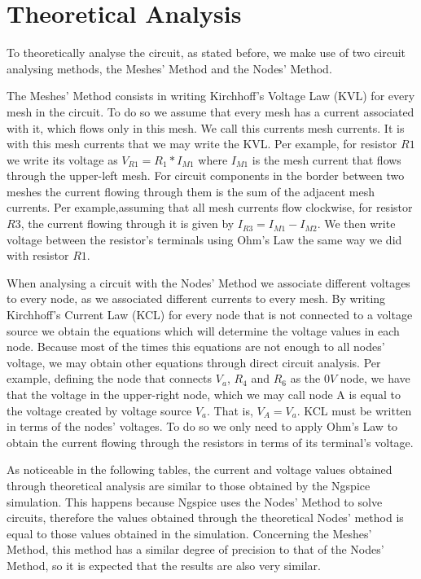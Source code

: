 \section{Theoretical Analysis}
\label{sec:analysis}

To theoretically analyse the circuit, as stated before, we make use of two circuit analysing methods, the Meshes' Method and the Nodes' Method.

The Meshes' Method consists in writing Kirchhoff's Voltage Law (KVL) for every mesh in the circuit. To do so we assume that every mesh has a current associated with it, which flows only in this mesh. We call this currents mesh currents. It is with this mesh currents that we may write the KVL. Per example, for resistor $R1$ we write its voltage as $V_{R1} =R_1*I_{M1}$ where $I_{M1}$ is the mesh current that flows through the upper-left mesh. For circuit components in the border between two meshes the current flowing through them is the sum of the adjacent mesh currents. Per example,assuming that all mesh currents flow clockwise, for resistor $R3$, the current flowing through it is given by $I_{R3} = I_{M1}-I_{M2}$. We then write voltage between the resistor's terminals using Ohm's Law the same way we did with resistor $R1$.

When analysing a circuit with the Nodes' Method we associate different voltages to every node, as we associated different currents to every mesh. By writing Kirchhoff's Current Law (KCL) for every node that is not connected to a voltage source we obtain the equations which will determine the voltage values in each node. Because most of the times this equations are not enough to all nodes' voltage, we may obtain other equations through direct circuit analysis. Per example, defining the node that connects $V_a$, $R_4$ and $R_6$ as the $0V$ node, we have that the voltage in the upper-right node, which we may call node A is equal to the voltage created by voltage source $V_a$. That is, $V_A = V_a$. KCL must be written in terms of the nodes' voltages. To do so we only need to apply Ohm's Law to obtain the current flowing through the resistors in terms of its terminal's voltage.

As noticeable in the following tables, the current and voltage values obtained through theoretical analysis are similar to those obtained by the Ngspice simulation. This happens because Ngspice uses the Nodes' Method to solve circuits, therefore the values obtained through the theoretical Nodes' method is equal to those values obtained in the simulation. Concerning the Meshes' Method, this method has a similar degree of precision to that of the Nodes' Method, so it is expected that the results are also very similar.

